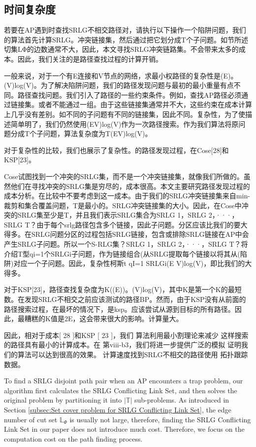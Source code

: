 \subsection{时间复杂度}
若要在AP遇到时查找SRLG不相交路径对，请执行以下操作一个陷阱问题，我们的算法首先计算SRLG。冲突链接集，然后通过把它划分成T个子问题。如节所述切集LΦ的边数通常不大，因此，本文寻找SRLG冲突链路集。不会带来太多的成本。因此，我们关注的是路径查找过程的计算开销。

一般来说，对于一个有E连接和V节点的网络，求最小权路径的复杂性是(E)。(V)log(V)。为了解决陷阱问题，我们的路径发现问题与最初的最小重量有点不同。路径查找问题。我们引入了路径的一些约束条件。例如，查找AP路径必须通过链接集。或者不能通过一组。由于这些链接集通常并不大，这些约束在成本计算上几乎没有差别。如不同的子问题有不同的链接集，因此不同。复杂性，为了使描述简单明了，我们仍然使用(EV)log(V)作为一次路径搜索。作为我们算法将原问题分成T个子问题，算法复杂度为T(EV)log(V)。

对于复杂性的比较，我们也展示了复杂性。的路径发现过程，在Cose[28]和KSP[23]。

Cose试图找到一个冲突的SRLG集，而不是一个冲突链接集，就像我们所做的。虽然他们在寻找冲突的SRLG集是穷尽的，成本很高。本文主要研究路径发现过程的成本分析。在比较中不要考虑到这一成本。由于我们的SRLG冲突链接集来自min-裁剪和集合覆盖问题，T是最小的。SRLG冲突链接集的大小。因此，在Cose中冲突的SRLG集至少是T，并且我们表示SRLG集合为SRLG 1，SRLG 2，···，SRLG T？由于每个srlg路径包含多个链接，因此子问题。分区应该比我们的要大得多。在SRLG问题分区的过程包括SRLG链接，包含或排除SRLG链接在AP中会产生SRLG子问题。所以一个S-RLG集？SRLG 1，SRLG 2，···，SRLG T？将介绍T型qi=1个SRLGi子问题，作为链接组合(从SRLG提取每个链接以将其从(陷阱)对应一个子问题。因此，复杂性柯斯t qI=1 SRLGi(E V)log(V)，即比我们的大得多。

对于KSP[23]，路径查找复杂度为K((E))。(V)log(V)，其中K是第一个K的最短数。在发现SRLG不相交之前应该测试的路径BP。然而，由于KSP没有从前面的路径搜索过程，在最坏的情况下，是ksp。应该尝试从源到目标的所有路径。因此，最糟糕的K值是2E，这会带来很大的影响。计算量大。

因此，相对于成本[ 28 ]和KSP [ 23 ]，我们
算法利用最小割理论来减少
这样搜索的路径具有最小的计算成本。在
第viii-b3，我们将进一步提供广泛的模拟
证明我们的算法可以达到很高的效果。
计算速度找到SRLG不相交的路径使用
拓扑跟踪数据。

To find a SRLG disjoint path pair when an AP encounters a trap problem, our algorithm first calculates the SRLG Conflicting Link Set, and then solves the original problem by partitioning it into $|\mathbb{T}|$ sub-problems. As introduced in Section \ref{subsec:Set cover problem for SRLG Conflicting Link Set},  the edge number of cut set $\mathbb{L}_{\Phi}$ is usually not large, therefore, finding the SRLG Conflicting Link Set in our paper does not introduce much cost. Therefore, we focus on the computation cost on the path finding process.

